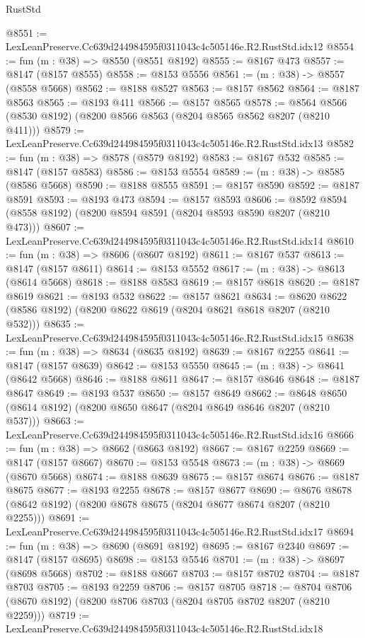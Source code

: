 \begin{lexlean}{RustStd}
\begin{coremodule}
@8551 := LexLeanPreserve.Cc639d244984595f0311043c4c505146e.R2.RustStd.idx12
@8554 := fun (m : @38) => @8550 (@8551 @8192)
@8555 := @8167 @473
@8557 := @8147 (@8157 @8555)
@8558 := @8153 @5556
@8561 := (m : @38) -> @8557 (@8558 @5668)
@8562 := @8188 @8527
@8563 := @8157 @8562
@8564 := @8187 @8563
@8565 := @8193 @411
@8566 := @8157 @8565
@8578 := @8564 @8566 (@8530 @8192) (@8200 @8566 @8563 (@8204 @8565 @8562 @8207 (@8210 @411)))
@8579 := LexLeanPreserve.Cc639d244984595f0311043c4c505146e.R2.RustStd.idx13
@8582 := fun (m : @38) => @8578 (@8579 @8192)
@8583 := @8167 @532
@8585 := @8147 (@8157 @8583)
@8586 := @8153 @5554
@8589 := (m : @38) -> @8585 (@8586 @5668)
@8590 := @8188 @8555
@8591 := @8157 @8590
@8592 := @8187 @8591
@8593 := @8193 @473
@8594 := @8157 @8593
@8606 := @8592 @8594 (@8558 @8192) (@8200 @8594 @8591 (@8204 @8593 @8590 @8207 (@8210 @473)))
@8607 := LexLeanPreserve.Cc639d244984595f0311043c4c505146e.R2.RustStd.idx14
@8610 := fun (m : @38) => @8606 (@8607 @8192)
@8611 := @8167 @537
@8613 := @8147 (@8157 @8611)
@8614 := @8153 @5552
@8617 := (m : @38) -> @8613 (@8614 @5668)
@8618 := @8188 @8583
@8619 := @8157 @8618
@8620 := @8187 @8619
@8621 := @8193 @532
@8622 := @8157 @8621
@8634 := @8620 @8622 (@8586 @8192) (@8200 @8622 @8619 (@8204 @8621 @8618 @8207 (@8210 @532)))
@8635 := LexLeanPreserve.Cc639d244984595f0311043c4c505146e.R2.RustStd.idx15
@8638 := fun (m : @38) => @8634 (@8635 @8192)
@8639 := @8167 @2255
@8641 := @8147 (@8157 @8639)
@8642 := @8153 @5550
@8645 := (m : @38) -> @8641 (@8642 @5668)
@8646 := @8188 @8611
@8647 := @8157 @8646
@8648 := @8187 @8647
@8649 := @8193 @537
@8650 := @8157 @8649
@8662 := @8648 @8650 (@8614 @8192) (@8200 @8650 @8647 (@8204 @8649 @8646 @8207 (@8210 @537)))
@8663 := LexLeanPreserve.Cc639d244984595f0311043c4c505146e.R2.RustStd.idx16
@8666 := fun (m : @38) => @8662 (@8663 @8192)
@8667 := @8167 @2259
@8669 := @8147 (@8157 @8667)
@8670 := @8153 @5548
@8673 := (m : @38) -> @8669 (@8670 @5668)
@8674 := @8188 @8639
@8675 := @8157 @8674
@8676 := @8187 @8675
@8677 := @8193 @2255
@8678 := @8157 @8677
@8690 := @8676 @8678 (@8642 @8192) (@8200 @8678 @8675 (@8204 @8677 @8674 @8207 (@8210 @2255)))
@8691 := LexLeanPreserve.Cc639d244984595f0311043c4c505146e.R2.RustStd.idx17
@8694 := fun (m : @38) => @8690 (@8691 @8192)
@8695 := @8167 @2340
@8697 := @8147 (@8157 @8695)
@8698 := @8153 @5546
@8701 := (m : @38) -> @8697 (@8698 @5668)
@8702 := @8188 @8667
@8703 := @8157 @8702
@8704 := @8187 @8703
@8705 := @8193 @2259
@8706 := @8157 @8705
@8718 := @8704 @8706 (@8670 @8192) (@8200 @8706 @8703 (@8204 @8705 @8702 @8207 (@8210 @2259)))
@8719 := LexLeanPreserve.Cc639d244984595f0311043c4c505146e.R2.RustStd.idx18

\end{coremodule}
\end{lexlean}
